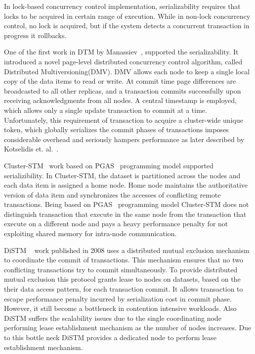 \documentclass[12pt,english]{report}
\begin{document}
In lock-based concurrency control implementation, serializability requires that locks to be acquired in certain range of execution. While in non-lock concurrency control, no lock is acquired, but if the system detects a concurrent transaction in progress it rollbacks.

One of the first work in DTM by Manassiev~\cite{Manassiev:2006:EDV:1122971.1123002}, supported the serializability. It introduced a novel page-level distributed concurrency control algorithm, called Distributed Multiversioning(DMV). DMV allows each node to keep a single local copy of the data items to read or write. At commit time page differences are broadcasted to all other replicas, and a transaction commits successfully upon receiving acknowledgments from all nodes. A central timestamp is employed, which allows only a single update transaction to commit at a time. Unfortunately, this requirement of transaction to acquire a cluster-wide unique token, which globally serializes the commit phases of transactions imposes considerable overhead and seriously hampers performance as later described by Kotselidis et. al.~\cite{Kotselidis08distm:a}.

Cluster-STM~\cite{Bocchino:2008:STM:1345206.1345242} work based on PGAS~\cite{PGAS:Programmin:Model} programming model supported serializibility. In Cluster-STM, the dataset is partitioned across the nodes and each data item is assigned a home node. Home node maintains the authoritative version of data item and synchronizes the accesses of conflicting remote transactions. Being based on PGAS~\cite{PGAS:Programmin:Model} programming model Cluster-STM does not distinguish transaction that execute in the same node from the transaction that execute on a different node and pays a heavy performance penalty for not exploiting shared memory for intra-node communication.

DiSTM ~\cite{Kotselidis08distm:a} work published in 2008 uses a distributed mutual exclusion mechanism to coordinate the commit of transactions. This mechanism ensures that no two conflicting transactions try to commit simultaneously. To provide distributed mutual exclusion this protocol grants lease to nodes on datasets, based on the their data access pattern, for each transaction commit. It allows transaction to escape performance penalty incurred by serialization cost in commit phase. However, it still become a bottleneck in contention intensive workloads. Also DiSTM suffers the scalability issues due to the single coordinating node performing lease establishment mechanism as the number of nodes increases. Due to this bottle neck DiSTM provides a dedicated node to perform lease establishment mechanism.
\end{document}
